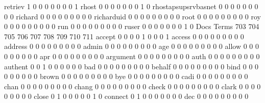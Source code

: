 \documentclass[compress,8pt]{beamer}
\begin{document}
\begin{frame}
\begin{Schunk}
  retriev                                    1   0   0   0   0   0   0   0   1
  rhost                                      0   0   0   0   0   0   0   1   0
  rhostapsupsrvbasnet                        0   0   0   0   0   0   0   0   0
  richard                                    0   0   0   0   0   0   0   0   0
  richarduid                                 0   0   0   0   0   0   0   0   0
  root                                       0   0   0   0   0   0   0   0   0
  roy                                        0   0   0   0   0   0   0   0   0
  run                                        0   0   0   0   0   0   0   0   0
  ruser                                      0   0   0   0   0   0   0   1   0
                                          Docs
Terms                                      703 704 705 706 707 708 709 710 711
  accept                                     0   0   0   0   1   0   0   0   1
  access                                     0   0   0   0   0   0   0   0   0
  address                                    0   0   0   0   0   0   0   0   0
  admin                                      0   0   0   0   0   0   0   0   0
  age                                        0   0   0   0   0   0   0   0   0
  allow                                      0   0   0   0   0   0   0   0   0
  apr                                        0   0   0   0   0   0   0   0   0
  argument                                   0   0   0   0   0   0   0   0   0
  auth                                       0   0   0   0   0   0   0   0   0
  authent                                    0   0   1   0   0   0   0   0   0
  bad                                        0   0   0   0   0   0   0   0   0
  behalf                                     0   0   0   0   0   0   0   0   0
  bind                                       0   0   0   0   0   0   0   0   0
  brown                                      0   0   0   0   0   0   0   0   0
  bye                                        0   0   0   0   0   0   0   0   0
  cadi                                       0   0   0   0   0   0   0   0   0
  chan                                       0   0   0   0   0   0   0   0   0
  chang                                      0   0   0   0   0   0   0   0   0
  check                                      0   0   0   0   0   0   0   0   0
  clark                                      0   0   0   0   0   0   0   0   0
  close                                      0   1   0   0   0   0   0   1   0
  connect                                    0   1   0   0   0   0   0   0   0
  dec                                        0   0   0   0   0   0   0   0   0

\end{Schunk}
\end{frame}
\end{document}
